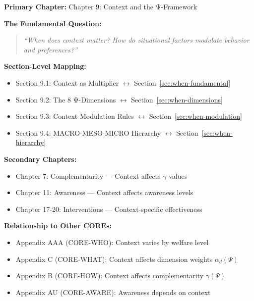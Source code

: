 
\begin{tcolorbox}[colback=purple!5!white, colframe=purple!75!black,
    title=Chapter Linkage]

\textbf{Primary Chapter:} Chapter 9: Context and the Ψ-Framework

\vspace{0.3em}
\textbf{The Fundamental Question:}
\begin{quote}
\textit{``When does context matter? How do situational factors modulate behavior and preferences?''}
\end{quote}

\textbf{Section-Level Mapping:}
\begin{itemize}[nosep]
\item Section 9.1: Context as Multiplier $\leftrightarrow$ Section~\ref{sec:when-fundamental}
\item Section 9.2: The 8 Ψ-Dimensions $\leftrightarrow$ Section~\ref{sec:when-dimensions}
\item Section 9.3: Context Modulation Rules $\leftrightarrow$ Section~\ref{sec:when-modulation}
\item Section 9.4: MACRO-MESO-MICRO Hierarchy $\leftrightarrow$ Section~\ref{sec:when-hierarchy}
\end{itemize}

\textbf{Secondary Chapters:}
\begin{itemize}[nosep]
\item Chapter 7: Complementarity --- Context affects $\gamma$ values
\item Chapter 11: Awareness --- Context affects awareness levels
\item Chapter 17-20: Interventions --- Context-specific effectiveness
\end{itemize}

\textbf{Relationship to Other COREs:}
\begin{itemize}[nosep]
\item Appendix AAA (CORE-WHO): Context varies by welfare level
\item Appendix C (CORE-WHAT): Context affects dimension weights $\alpha_d(\Psi)$
\item Appendix B (CORE-HOW): Context affects complementarity $\gamma(\Psi)$
\item Appendix AU (CORE-AWARE): Awareness depends on context
\end{itemize}

\end{tcolorbox}

